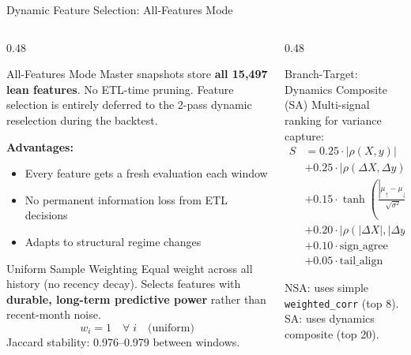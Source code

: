\documentclass[aspectratio=169,10pt]{beamer}
\begin{document}
\begin{frame}[fragile]{Dynamic Feature Selection: All-Features Mode}
\begin{columns}[T]
\begin{column}{0.48\textwidth}
\begin{block}{All-Features Mode}
\footnotesize
Master snapshots store \textbf{all 15{,}497 lean features}. No ETL-time pruning. Feature selection is entirely deferred to the 2-pass dynamic reselection during the backtest.

\vspace{0.15cm}
\textbf{Advantages:}
\begin{itemize}\scriptsize
  \item Every feature gets a fresh evaluation each window
  \item No permanent information loss from ETL decisions
  \item Adapts to structural regime changes
\end{itemize}
\end{block}

\begin{block}{Uniform Sample Weighting}
\footnotesize
Equal weight across all history (no recency decay). Selects features with \textbf{durable, long-term predictive power} rather than recent-month noise.
\[
w_i = 1 \quad \forall\; i \quad \text{(uniform)}
\]
Jaccard stability: 0.976--0.979 between windows.
\end{block}
\end{column}
\begin{column}{0.48\textwidth}
\begin{block}{Branch-Target: Dynamics Composite (SA)}
\footnotesize
Multi-signal ranking for variance capture:
\begin{align*}
S &= 0.25 \cdot |\rho(X,y)| & \text{Level}\\
  &+ 0.25 \cdot |\rho(\Delta X, \Delta y)| & \text{Diff}\\
  &+ 0.15 \cdot \tanh\!\left(\frac{|\mu_{\uparrow}{-}\mu_{\downarrow}|}{\sqrt{\sigma^2}}\right) & \text{Direction}\\
  &+ 0.20 \cdot |\rho(|\Delta X|, |\Delta y|)| & \text{Magnitude}\\
  &+ 0.10 \cdot \text{sign\_agree} & \text{Sign}\\
  &+ 0.05 \cdot \text{tail\_align} & \text{Tail}
\end{align*}
\end{block}
\footnotesize
NSA: uses simple \texttt{weighted\_corr} (top 8). SA: uses dynamics composite (top 20).
\end{column}
\end{columns}
\end{frame}
\end{document}
